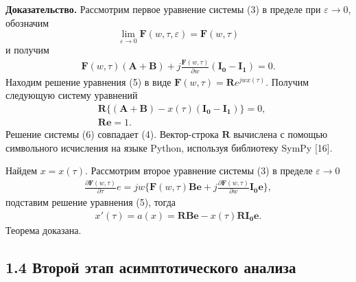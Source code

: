 \textbf{Доказательство.}  Рассмотрим первое уравнение системы (3) в пределе при $\varepsilon\rightarrow 0$, обозначим $$\lim_{\varepsilon\to 0} \boldsymbol{F}(w,\tau,\varepsilon)=\boldsymbol{F}(w,\tau)$$  и получим
\begin{align}
	\boldsymbol{F}(w,\tau)(\boldsymbol{A}+\boldsymbol{B})+j\frac{\boldsymbol{F}(w,\tau)}{\partial w}(\boldsymbol{I_{0}}-\boldsymbol{I_{1}})=0.
\end{align}
Находим решение уравнения (5) в виде $\boldsymbol{F}(w,\tau)=\boldsymbol{R}e^{jwx(\tau)}$. Получим следующую систему уравнений\\
\begin{equation}
	\begin{split}
		&\boldsymbol{R}\{(\boldsymbol{A}+\boldsymbol{B})-x(\tau)(\boldsymbol{I_{0}}-\boldsymbol{I_{1}})\}=0,\\
		&\boldsymbol{R}\boldsymbol{e}=1.
	\end{split}
\end{equation}
Решение системы (6) совпадает (4).
Вектор-строка $\boldsymbol{R}$ вычислена с помощью символьного исчисления на языке Python, используя библиотеку SymPy [16].

Найдем $x=x(\tau)$. Рассмотрим второе уравнение системы (3) в пределе $\varepsilon \rightarrow 0$
\begin{align*}
	\frac{\partial\boldsymbol{F}(w,\tau)}{\partial\tau}e=jw\bigg\{\boldsymbol{F}(w,\tau)\boldsymbol{Be}+j\frac{\partial\boldsymbol{F}(w,\tau)}{\partial w}\boldsymbol{I_{0}e}\bigg\},
\end{align*} 
подставим решение уравнения (5), тогда
\begin{align}
	x'(\tau)=a(x)=\boldsymbol{RBe}-x(\tau)\boldsymbol{RI_{0}e}.
\end{align} 
Теорема доказана.

\newpage
\subsection{1.4 Второй этап асимптотического анализа}

